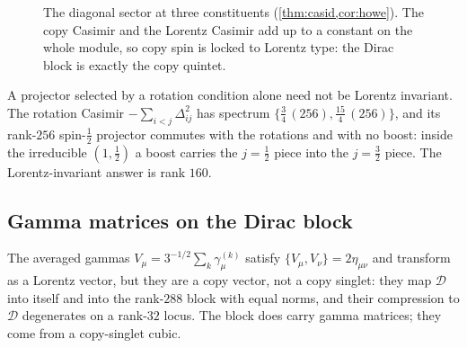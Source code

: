 \begin{figure}[t]
\centering
{}
\caption{The diagonal sector at three constituents (\cref{thm:casid,cor:howe}). The copy Casimir and the Lorentz Casimir add up to a constant
on the whole module, so copy spin is locked to Lorentz type: the Dirac block is exactly the copy quintet.}
\label{fig:dualpair}
\end{figure}

A projector selected by a rotation condition alone need not be Lorentz invariant. The rotation Casimir $-\sum_{i<j}\Delta_{ij}^2$ has spectrum
$\{\tfrac34\,(256),\tfrac{15}4\,(256)\}$, and its rank-$256$ spin-$\tfrac12$ projector commutes with the rotations and with no boost: inside the
irreducible $(1,\tfrac12)$ a boost carries the $j=\tfrac12$ piece into the $j=\tfrac32$ piece. The Lorentz-invariant answer is rank $160$.

\subsection{Gamma matrices on the Dirac block}

The averaged gammas $V_\mu=3^{-1/2}\sum_k\gamma^{(k)}_\mu$ satisfy $\{V_\mu,V_\nu\}=2\eta_{\mu\nu}$ and transform as a Lorentz vector, but they are a
copy vector, not a copy singlet: they map $\mathcal D$ into itself and into the rank-$288$ block with equal norms, and their compression to
$\mathcal D$ degenerates on a rank-$32$ locus. The block does carry gamma matrices; they come from a copy-singlet cubic.

